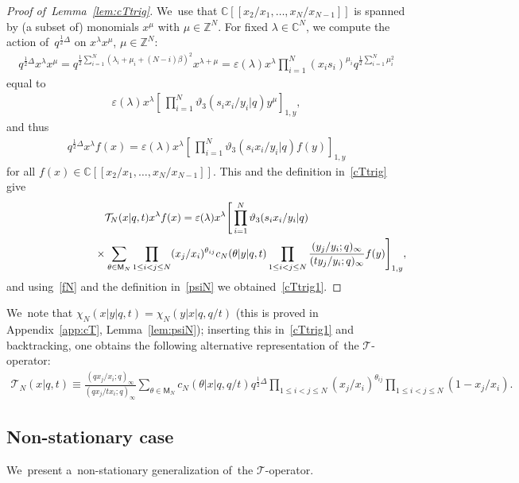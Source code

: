 \documentclass[pdftex]{sigma}%
\numberwithin{equation}{section}
\newcommand{\C}{{\mathbb C}}
\newcommand{\Z}{{\mathbb Z}}
\newcommand{\cT}{{\mathcal T}}
\begin{document}
\begin{proof}[Proof of~Lemma~\ref{lem:cTtrig}] We~use that $\C[[x_2/x_1,\dots,x_N/x_{N-1}]]$ is spanned by (a subset of) monomials $x^\mu$ with $\mu\in\Z^N$.
For fixed $\lambda\in\C^N$, we compute the action of~$q^{\frac12\Delta}$ on $x^\lambda x^{\mu}$, $\mu\in\Z^N$:
\begin{gather*}
q^{\frac12\Delta} x^\lambda x^{\mu} = q^{\frac12\sum_{i=1}^N(\lambda_i+\mu_i+(N-i)\beta)^2}x^{\lambda +\mu} =\varepsilon(\lambda) x^\lambda \prod_{i=1}^N (x_is_i)^{\mu_i} q^{\frac12\sum_{i=1}^N\mu_i^2}
\end{gather*}
equal to
\begin{gather*}
 \varepsilon(\lambda) x^\lambda\left[\,\prod_{i=1}^N \vartheta_3(s_ix_i/y_i|q) y^\mu \right]_{1,y}\! ,
\end{gather*}
and thus
\begin{gather*}
q^{\frac12\Delta} x^\lambda f(x) = \varepsilon(\lambda) x^\lambda\left[\,\prod_{i=1}^N \vartheta_3(s_ix_i/y_i|q) f(y) \right]_{1,y}
\end{gather*}
for all $f(x)\in\C[[x_2/x_1,\dots,x_N/x_{N-1}]]$. This and the definition in~\eqref{cTtrig} give
\begin{gather*}
\cT_N(x|q,t) x^\lambda f(x) = \varepsilon(\lambda) x^\lambda \Biggl[\, \prod_{i=1}^N \vartheta_3(s_ix_i/y_i|q)
\\ \hphantom{\cT_N(x|q,t) x^\lambda f(x) =}
{}\times\sum_{\theta\in\mathsf{M}_N} \prod_{1\leq i<j\leq N}(x_j/x_i)^{\theta_{ij}} c_N(\theta|y|q,t)\prod_{1\leq i<j\leq N}\frac{(y_j/y_i;q)_\infty}{(ty_j/y_i;q)_\infty}f(y)\Biggr]_{1,y} ,
\end{gather*}
and using~\eqref{fN} and the definition in~\eqref{psiN} we obtained~\eqref{cTtrig1}.
\end{proof}

We~note that $\chi_N(x|y|q,t)= \chi_N(y|x|q,q/t)$ (this is proved in Appendix~\ref{app:cT}, Lemma~\ref{lem:psiN}); inserting this in~\eqref{cTtrig1} and backtracking, one obtains the following alternative representation of~the $\cT$-operator:
\begin{gather}
\label{cTtrig2}
\cT_N(x|q,t) \equiv \frac{(qx_j/x_i;q)_\infty}{(qx_j/tx_i;q)_\infty} \sum_{\theta\in\mathsf{M}_N}c_N(\theta|x|q,q/t)q^{\frac12\Delta}\!\!\!\prod_{1\leq i<j\leq N}\!\!\!(x_j/x_i)^{\theta_{ij}}\!\!\! \prod_{1\leq i<j\leq N}\!\!\!(1-x_j/x_i).
\end{gather}


\subsection{Non-stationary case}
\label{sec:cTell}
We~present a~non-stationary generalization of~the $\cT$-operator.
\end{document}
